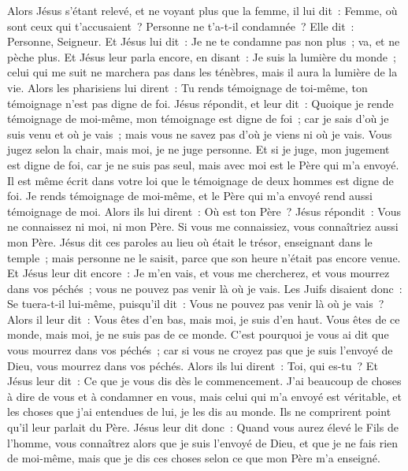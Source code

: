 \begin{multicols}{2}
Alors Jésus s'étant relevé, et ne voyant plus que la femme, il lui dit~: Femme, où sont ceux qui t'accusaient~? Personne ne t'a-t-il condamnée~?
Elle dit~: Personne, Seigneur. Et Jésus lui dit~: Je ne te condamne pas non plus~; va, et ne pèche plus.
Et Jésus leur parla encore, en disant~: Je suis la lumière du monde~; celui qui me suit ne marchera pas dans les ténèbres, mais il aura la lumière de la vie.
Alors les pharisiens lui dirent~: Tu rends témoignage de toi-même, ton témoignage n'est pas digne de foi.
Jésus répondit, et leur dit~: Quoique je rende témoignage de moi-même, mon témoignage est digne de foi~; car je sais d'où je suis venu et où je vais~; mais vous ne savez pas d'où je viens ni où je vais.
Vous jugez selon la chair, mais moi, je ne juge personne.
Et si je juge, mon jugement est digne de foi, car je ne suis pas seul, mais avec moi est le Père qui m'a envoyé.
Il est même écrit dans votre loi que le témoignage de deux hommes est digne de foi.
Je rends témoignage de moi-même, et le Père qui m'a envoyé rend aussi témoignage de moi.
Alors ils lui dirent~: Où est ton Père~? Jésus répondit~: Vous ne connaissez ni moi, ni mon Père. Si vous me connaissiez, vous connaîtriez aussi mon Père.
Jésus dit ces paroles au lieu où était le trésor, enseignant dans le temple~; mais personne ne le saisit, parce que son heure n'était pas encore venue.
Et Jésus leur dit encore~: Je m'en vais, et vous me chercherez, et vous mourrez dans vos péchés~; vous ne pouvez pas venir là où je vais.
Les Juifs disaient donc~: Se tuera-t-il lui-même, puisqu'il dit~: Vous ne pouvez pas venir là où je vais~?
Alors il leur dit~: Vous êtes d'en bas, mais moi, je suis d'en haut. Vous êtes de ce monde, mais moi, je ne suis pas de ce monde.
C'est pourquoi je vous ai dit que vous mourrez dans vos péchés~; car si vous ne croyez pas que je suis l'envoyé de Dieu, vous mourrez dans vos péchés.
Alors ils lui dirent~: Toi, qui es-tu~? Et Jésus leur dit~: Ce que je vous dis dès le commencement.
J'ai beaucoup de choses à dire de vous et à condamner en vous, mais celui qui m'a envoyé est véritable, et les choses que j'ai entendues de lui, je les dis au monde.
Ils ne comprirent point qu'il leur parlait du Père.
Jésus leur dit donc~: Quand vous aurez élevé le Fils de l'homme, vous connaîtrez alors que je suis l'envoyé de Dieu, et que je ne fais rien de moi-même, mais que je dis ces choses selon ce que mon Père m'a enseigné.

\end{multicols}
